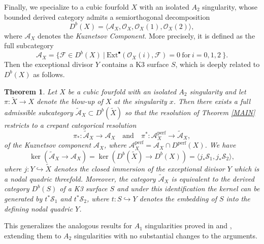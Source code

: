 \documentclass[a4paper, twoside, 11pt]{amsart}
\newtheorem{theorem}{Theorem}[section]
\theoremstyle{definition}
\theoremstyle{remark}
\numberwithin{equation}{theorem}
\DeclareMathOperator{\lilperf}{perf}
\newcommand{\dbx}{D^b(X)}
\begin{document}
Finally, we specialize to a cubic fourfold $X$ with an isolated $A_2$ singularity, whose bounded derived category admits a semiorthogonal decomposition 
\begin{equation*}
    \dbx = \langle \mathcal{A}_X, \mathcal{O}_X,\mathcal{O}_X(1),\mathcal{O}_X(2) \rangle,
\end{equation*}
where $\mathcal{A}_X$ denotes the \textit{Kuznetsov Component}. More precisely, it is defined as the full subcategory 
\begin{equation*}
    \mathcal{A}_X = \{ \mathcal{F} \in \dbx \ | \ \mathrm{Ext}^{\bullet}(\mathcal{O}_X(i), \mathcal{F}) = 0 \ \text{for} \ i = 0,1,2 \ \}.
\end{equation*}
Then the exceptional divisor $Y$ contains a K3 surface $S$, which is deeply related to $\dbx$ as follows.
\begin{theorem}\label{cubic_fourfold_main_result}
	Let $X$ be a cubic fourfold with an isolated $A_2$ singularity and let $\pi\colon \widetilde{X} \to X$ denote the blow-up of $X$ at the singularity $x$. Then there exists a full admissible subcategory $\widetilde{\mathcal{A}}_X \subset D^b(\widetilde{X})$ so that the resolution of Theorem \ref{MAIN} restricts to a crepant categorical resolution 
    \begin{equation*}
        \pi_*\colon\widetilde{\mathcal{A}}_X \longrightarrow \mathcal{A}_X \quad \text{and} \quad \pi^*\colon \mathcal{A}_X^{\lilperf} \to \widetilde{\mathcal{A}}_X,
    \end{equation*}
    of the Kuznetsov component $\mathcal{A}_X$, where $\mathcal{A}_X^{\lilperf} = \mathcal{A}_X \cap D^{\lilperf}(X)$. We have
    \begin{equation*}
        \ker(\widetilde{\mathcal{A}}_X \to \mathcal{A}_X) =  \ker(D^b(\widetilde{X}) \to \dbx) =\langle j_*\mathcal{S}_1, j_*\mathcal{S}_2 \rangle,
    \end{equation*}
    where $j\colon Y \hookrightarrow \widetilde{X}$ denotes the closed immersion of the exceptional divisor $Y$ which is a nodal quadric threefold.
    Moreover, the category $\widetilde{\mathcal{A}}_X$ is equivalent to the derived category $D^b(S)$ of a K3 surface $S$ and under this identification the kernel can be generated by $t^*\mathcal{S}_1$ and $t^*\mathcal{S}_2$, where $t\colon S \hookrightarrow Y$ denotes the embedding of $S$ into the defining nodal quadric $Y$.
\end{theorem}
This generalizes the analogous results for $A_1$ singularities proved in \cite[Theorem 5.2]{dervied_cat_cubic_fourfold} and \cite[§4]{Kernels_nodal}, extending them to $A_2$ singularities with no substantial changes to the arguments. \\
\end{document}
